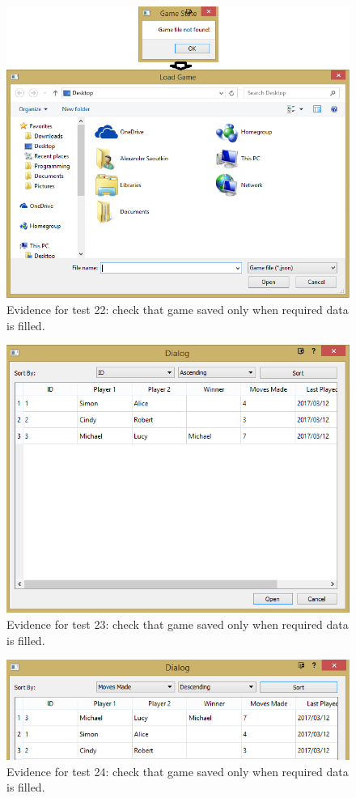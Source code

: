 \begin{figure}[H]
	\centering
	\includegraphics[width=1.0\textwidth]{images/screenshots/test-22}
	\caption{Evidence for test 22: check that game saved only when required data is filled.}
	\label{test-22}
\end{figure}
\begin{figure}[H]
	\centering
	\includegraphics[width=1.0\textwidth]{images/screenshots/test-23}
	\caption{Evidence for test 23: check that game saved only when required data is filled.}
	\label{test-23}
\end{figure}
\begin{figure}[H]
	\centering
	\includegraphics[width=1.0\textwidth]{images/screenshots/test-24}
	\caption{Evidence for test 24: check that game saved only when required data is filled.}
	\label{test-24}
\end{figure}
